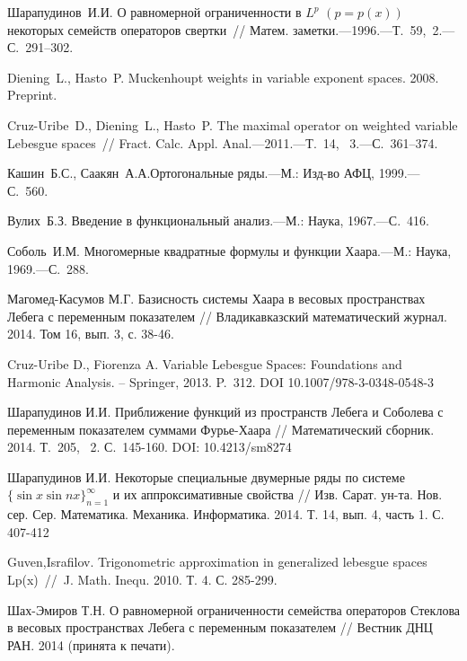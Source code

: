 \begin{thebibliography}{1}
Шарапудинов~И.И.
{О равномерной ограниченности в $L^p$ $(p=p(x))$ некоторых семейств операторов свертки~/\!/ Матем. заметки.---1996.---Т.~59,\No~2.---С.~291--302.}


Diening~L., Hasto~P.
{Muckenhoupt weights in variable exponent spaces. 2008. Preprint.}

Cruz-Uribe~D., Diening~L., Hasto~P.
{The maximal operator on weighted variable Lebesgue spaces~/\!/ Fract. Calc. Appl. Anal.---2011.---Т.~14, \No~3.---С.~361--374.}


Кашин~Б.С., Саакян~А.А.{Ортогональные ряды.---М.: Изд-во АФЦ, 1999.---С.~560.}


Вулих~Б.З.
{Введение в функциональный  анализ.---М.: Наука, 1967.---С.~416.}

Соболь~И.М.
{Многомерные квадратные формулы и функции Хаара.---М.: Наука, 1969.---С.~288.}

Магомед-Касумов М.Г. Базисность системы Хаара в весовых пространствах Лебега с переменным показателем // Владикавказский математический журнал. 2014. Том 16, вып. 3, с. 38-46.

Cruz-Uribe D., Fiorenza A.
{Variable Lebesgue Spaces: Foundations and Harmonic Analysis. – Springer, 2013. P.~312. DOI 10.1007/978-3-0348-0548-3}

Шарапудинов И.И.
{Приближение функций из пространств Лебега и Соболева с переменным показателем суммами Фурье-Хаара // Математический сборник. 2014. Т.~205, \No~2. С.~145-160. DOI: 10.4213/sm8274}

Шарапудинов И.И.
{Некоторые специальные двумерные ряды по системе $\{\sin x\sin nx\}_{n=1}^\infty$ и их аппроксимативные свойства // Изв. Сарат. ун-та. Нов. сер. Сер. Математика. Механика. Информатика. 2014. Т. 14, вып. 4, часть 1. С. 407-412}

Guven,Israfilov.
{Trigonometric approximation in generalized lebesgue spaces Lp(x)~//~J. Math. Inequ. 2010. Т. 4. С. 285-299.}

Шах-Эмиров Т.Н.
{О равномерной ограниченности семейства операторов Стеклова в весовых пространствах Лебега с переменным показателем // Вестник ДНЦ РАН. 2014 (принята к печати).}


\end{thebibliography}
